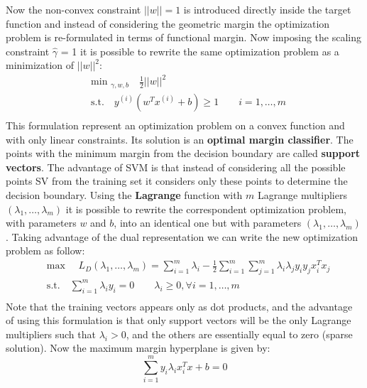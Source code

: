 \documentclass[11pt,a4paper]{article}
\begin{document}
Now the non-convex constraint $||w|| = 1$ is introduced directly inside the target function and instead of considering the geometric margin the optimization problem is re-formulated in terms of functional margin. Now imposing the scaling constraint $\hat{\gamma}$ = 1 it is possible to rewrite the same optimization problem as a minimization of $||w||^2$:
\begin{equation*}
 \begin{aligned}
 &\text{min }_{\gamma,w,b} \quad \frac{1}{2}||w||^2\\
 &\text{s.t.} \quad y^{(i)}(w^Tx^{(i)}+b) \geq 1 \qquad i = 1,\dots, m\\
 \end{aligned}
\end{equation*}
This formulation represent an optimization problem on a convex function and with only linear constraints. Its solution is an \textbf{optimal margin classifier}. The points with the minimum margin from the decision boundary are called \textbf{support vectors}. The advantage of SVM is that instead of considering all the possible points SV from the training set it considers only these points to determine the decision boundary. Using the \textbf{Lagrange} function with $m$ Lagrange multipliers $(\lambda_1,\dots,\lambda_m)$ it is possible to rewrite the correspondent optimization problem, with parameters $w$ and $b$, into an identical one but with parameters $(\lambda_1,\dots,\lambda_m)$. Taking advantage of the dual representation we can write the new optimization problem as follow:
\begin{equation*}
\begin{aligned}
&\text{max }\quad L_D(\lambda_1,\dots,\lambda_m) = \sum_{i = 1}^{m}\lambda_i - \frac{1}{2}\sum_{i = 1}^{m}\sum_{j = 1}^{m}\lambda_i\lambda_jy_iy_jx_i^Tx_j\\
&\text{s.t.} \quad \sum_{i = 1}^{m}\lambda_iy_i= 0 \qquad \lambda_i \geq 0, \forall i = 1,\dots,m\\
\end{aligned}
\end{equation*}
Note that the training vectors appears only as dot products, and the advantage of using this formulation is that only support vectors will be the only Lagrange multipliers such that $\lambda_i > 0$, and the others are essentially equal to zero (sparse solution). Now the maximum margin hyperplane is given by:
$$\sum_{i = 1}^{m} y_i \lambda_ix_i^Tx+b = 0$$
\end{document}
